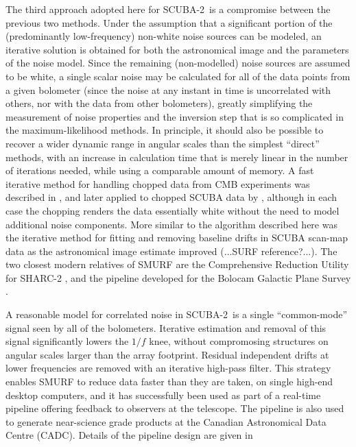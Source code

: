 \documentclass[useAMS,usenatbib,nofootinbib]{mn2e}
\newcommand{\scuba}{SCUBA-2}
\begin{document}

The third approach adopted here for \scuba\ is a compromise between
the previous two methods. Under the assumption that a significant
portion of the (predominantly low-frequency) non-white noise sources
can be modeled, an iterative solution is obtained for both the
astronomical image and the parameters of the noise model. Since the
remaining (non-modelled) noise sources are assumed to be white, a
single scalar noise may be calculated for all of the data points from
a given bolometer (since the noise at any instant in time is
uncorrelated with others, nor with the data from other bolometers),
greatly simplifying the measurement of noise properties and the
inversion step that is so complicated in the maximum-likelihood
methods. In principle, it should also be possible to recover a wider
dynamic range in angular scales than the simplest ``direct'' methods,
with an increase in calculation time that is merely linear in the
number of iterations needed, while using a comparable amount of
memory. A fast iterative method for handling chopped data from CMB
experiments was described in \citet{wright1996}, and later applied to
chopped SCUBA data by \citet{johnstone2000}, although in each case the
chopping renders the data essentially white without the need to model
additional noise components. More similar to the algorithm described
here was the iterative method for fitting and removing baseline drifts
in SCUBA scan-map data as the astronomical image estimate improved
(...SURF reference?...). The two closest modern relatives of SMURF are the
Comprehensive Reduction Utility for SHARC-2
\citep[CRUSH,][]{kovacs2008}, and the pipeline developed for the
Bolocam Galactic Plane Survey \citep{aguirre2010}.

A reasonable model for correlated noise in \scuba\ is a single
``common-mode'' signal seen by all of the bolometers. Iterative
estimation and removal of this signal significantly lowers the $1/f$
knee, without compromosing structures on angular scales larger than
the array footprint. Residual independent drifts at lower frequencies
are removed with an iterative high-pass filter. This strategy enables
SMURF to reduce data faster than they are taken, on single high-end
desktop computers, and it has successfully been used as part of a
real-time pipeline offering feedback to observers at the
telescope. The pipeline is also used to generate near-science grade
products at the Canadian Astronomical Data Centre (CADC). Details of
the pipeline design are given in \citet{gibb2005}
\end{document}
